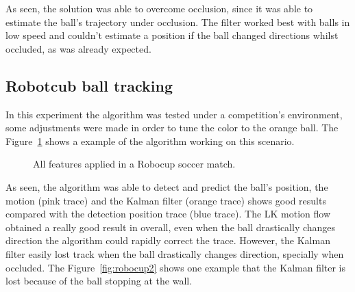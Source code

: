\documentclass[10pt,twocolumn,letterpaper]{article}
\begin{document}
As seen, the solution was able to overcome occlusion, since it was able to estimate the ball's trajectory under occlusion. The filter worked best with balls in low speed and couldn't estimate a position if the ball changed directions whilst occluded, as was already expected.

\subsection{Robotcub ball tracking}

In this experiment the algorithm was tested under a competition's environment, some adjustments were made in order to tune the color to the orange ball. The Figure~\ref{fig:robocup_1} shows a example of the algorithm working on this scenario.

\begin{figure}[!h]
\centering
\setlength{\fboxsep}{1pt}
\setlength{\fboxrule}{1pt}
\caption{All features applied in a Robocup soccer match.}\label{fig:robocup_1}
\end{figure}

As seen, the algorithm was able to detect and predict the ball's position, the motion (pink trace) and the Kalman filter (orange trace) shows good results compared with the detection position trace (blue trace). The LK motion flow obtained a really good result in overall, even when the ball drastically changes direction  the algorithm could rapidly correct the trace.  However,  the Kalman filter easily lost track when the ball drastically changes direction, specially when occluded. The Figure~\ref{fig:robocup2} shows one example that the Kalman filter is lost because of the ball stopping at the wall.
\end{document}

